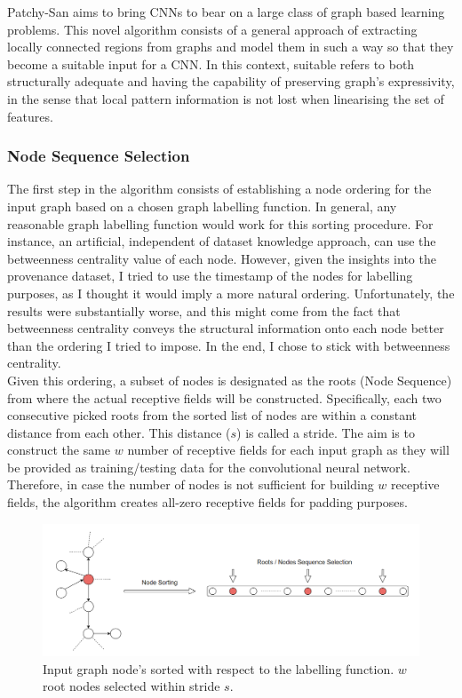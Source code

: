Patchy-San aims to bring CNNs to bear on a large class of graph based learning problems. This novel algorithm consists of a general approach of extracting locally connected regions from graphs and model them in such a way so that they become a suitable input for a CNN. In this context, suitable refers to both structurally adequate and having the capability of preserving graph's expressivity, in the sense that local pattern information is not lost when linearising the set of features. 


\subsubsection*{Node Sequence Selection} \label{node_seq_sel}

The first step in the algorithm consists of establishing a node ordering for the input graph based on a chosen graph labelling function. In general, any reasonable graph labelling function would work for this sorting procedure. For instance, an artificial, independent of dataset knowledge approach, can use the betweenness centrality value of each node. However, given the insights into the provenance dataset, I tried to use the timestamp of the nodes for labelling purposes, as I thought it would imply a more natural ordering. Unfortunately, the results were substantially worse, and this might come from the fact that betweenness centrality conveys the structural information onto each node better than the ordering I tried to impose. In the end, I chose to stick with betweenness centrality. \\

Given this ordering, a subset of nodes is designated as the roots (Node Sequence) from where the actual receptive fields will be constructed. Specifically, each two consecutive picked roots from the sorted list of nodes are within a constant distance from each other. This distance ($s$) is called a stride. The aim is to construct the same $w$ number of receptive fields for each input graph as they will be provided as training/testing data for the convolutional neural network. Therefore, in case the number of nodes is not sufficient for building $w$ receptive fields, the algorithm creates all-zero receptive fields for padding purposes. 

\begin{figure}[H]
  \centering
  \includegraphics[scale=0.4]{Images/nodeseqsel.png}
  \caption{Input graph node's sorted with respect to the labelling function. $w$ root nodes selected within stride $s$.}
  \label{nodeseqsel}
\end{figure}

